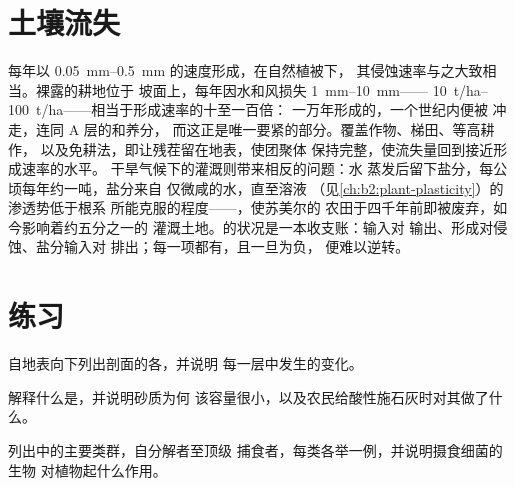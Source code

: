 \section{土壤流失}

\begin{proposition}[侵蚀、盐渍化与土壤平衡]\label{prop:b2:living-soil:erosion}
每年以 \qtyrange{0.05}{0.5}{mm} 的速度形成，在自然植被下，
其侵蚀速率与之大致相当。裸露的耕地位于
坡面上，每年因水和风损失 \qtyrange{1}{10}{mm}——
\qtyrange{10}{100}{t/ha}——相当于形成速率的十至一百倍：
一万年形成的，一个世纪内便被
冲走，连同 A 层的和养分，
而这正是唯一要紧的部分。覆盖作物、梯田、等高耕作，
以及免耕法，即让残茬留在地表，使团聚体
保持完整，使流失量回到接近形成速率的水平。
干旱气候下的灌溉则带来相反的问题：水
蒸发后留下盐分，每公顷每年约一吨，盐分来自
仅微咸的水，直至溶液
（见\cref{ch:b2:plant-plasticity}）的渗透势低于根系
所能克服的程度——\emph{}，使苏美尔的
农田于四千年前即被废弃，如今影响着约五分之一的
灌溉土地。的状况是一本收支账：输入对
输出、形成对侵蚀、盐分输入对
排出；每一项都有，且一旦为负，
便难以逆转。
\end{proposition}

\section{练习}

\begin{exercise}[$\star$]\label{exo:b2:living-soil:1}
自地表向下列出剖面的各，并说明
每一层中发生的变化。
\end{exercise}

\begin{exercise}[$\star$]\label{exo:b2:living-soil:2}
解释什么是，并说明砂质为何
该容量很小，以及农民给酸性施石灰时对其做了什么。
\end{exercise}

\begin{exercise}[$\star$]\label{exo:b2:living-soil:3}
列出中的主要类群，自分解者至顶级
捕食者，每类各举一例，并说明摄食细菌的生物
对植物起什么作用。
\end{exercise}

